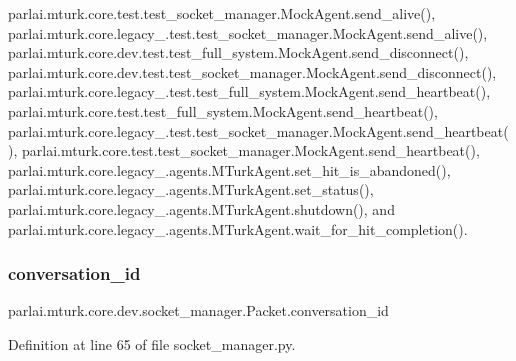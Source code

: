 parlai.\+mturk.\+core.\+test.\+test\+\_\+socket\+\_\+manager.\+Mock\+Agent.\+send\+\_\+alive(), parlai.\+mturk.\+core.\+legacy\+\_.\+test.\+test\+\_\+socket\+\_\+manager.\+Mock\+Agent.\+send\+\_\+alive(), parlai.\+mturk.\+core.\+dev.\+test.\+test\+\_\+full\+\_\+system.\+Mock\+Agent.\+send\+\_\+disconnect(), parlai.\+mturk.\+core.\+dev.\+test.\+test\+\_\+socket\+\_\+manager.\+Mock\+Agent.\+send\+\_\+disconnect(), parlai.\+mturk.\+core.\+legacy\+\_.\+test.\+test\+\_\+full\+\_\+system.\+Mock\+Agent.\+send\+\_\+heartbeat(), parlai.\+mturk.\+core.\+test.\+test\+\_\+full\+\_\+system.\+Mock\+Agent.\+send\+\_\+heartbeat(), parlai.\+mturk.\+core.\+legacy\+\_.\+test.\+test\+\_\+socket\+\_\+manager.\+Mock\+Agent.\+send\+\_\+heartbeat(), parlai.\+mturk.\+core.\+test.\+test\+\_\+socket\+\_\+manager.\+Mock\+Agent.\+send\+\_\+heartbeat(), parlai.\+mturk.\+core.\+legacy\+\_.\+agents.\+M\+Turk\+Agent.\+set\+\_\+hit\+\_\+is\+\_\+abandoned(), parlai.\+mturk.\+core.\+legacy\+\_.\+agents.\+M\+Turk\+Agent.\+set\+\_\+status(), parlai.\+mturk.\+core.\+legacy\+\_.\+agents.\+M\+Turk\+Agent.\+shutdown(), and parlai.\+mturk.\+core.\+legacy\+\_.\+agents.\+M\+Turk\+Agent.\+wait\+\_\+for\+\_\+hit\+\_\+completion().

\mbox{\label{classparlai_1_1mturk_1_1core_1_1dev_1_1socket__manager_1_1Packet_a4214fa53d6892dbfaa37cf6e3503f945}} 
\subsubsection{\texorpdfstring{conversation\+\_\+id}{conversation\_id}}
{\footnotesize\ttfamily parlai.\+mturk.\+core.\+dev.\+socket\+\_\+manager.\+Packet.\+conversation\+\_\+id}



Definition at line 65 of file socket\+\_\+manager.\+py.



